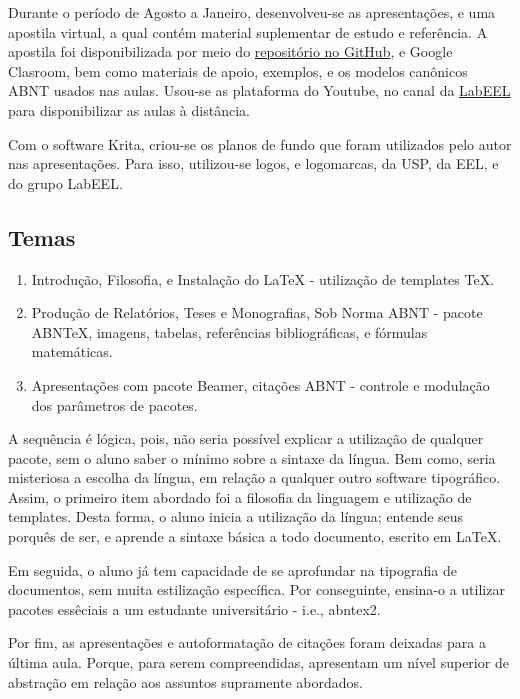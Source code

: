 \documentclass[
12pt,				%
openright,			%
oneside,			%
a4paper,			%
english,			%
french,				%
spanish,			%
brazil,				%
]{abntex2}
\begin{document}
Durante o período de Agosto a Janeiro, desenvolveu-se as apresentações, e
uma apostila virtual, a qual contém material suplementar de estudo e
referência. A apostila foi disponibilizada por meio do
\href{https://github.com/26-55-87-BuddhiLW/MC-LaTeX}{repositório no
  GitHub}, e Google Clasroom, bem como materiais de apoio,
exemplos, e os modelos canônicos ABNT usados nas aulas.  Usou-se as
plataforma do Youtube, no canal da
\href{https://www.youtube.com/channel/UC9kL6UL-iEq4nJKGs1nezQQ}{LabEEL}
para disponibilizar as aulas à distância.

Com o software Krita, criou-se os planos de fundo que foram utilizados
pelo autor nas apresentações. Para isso, utilizou-se logos, e
logomarcas, da USP, da EEL, e do grupo LabEEL.


\subsection{Temas}

\begin{enumerate}
\item Introdução, Filosofia, e Instalação do LaTeX - utilização de templates TeX.
\item Produção de Relatórios, Teses e Monografias, Sob Norma ABNT -
  pacote ABNTeX, imagens, tabelas, referências bibliográficas, e
  fórmulas matemáticas.
\item  Apresentações com pacote Beamer, citações ABNT - controle e modulação dos parâmetros de pacotes.
\end{enumerate}


A sequência é lógica, pois, não seria possível explicar a utilização de qualquer
pacote, sem o aluno saber o mínimo sobre a sintaxe da língua. Bem como, seria
misteriosa a escolha da língua, em relação a qualquer outro software tipográfico. Assim,
o primeiro item abordado foi a filosofia da linguagem e utilização de templates.
Desta forma, o aluno inicia a utilização da língua; entende seus porquês de ser,
e aprende a sintaxe básica a todo documento, escrito em \LaTeX.

Em seguida, o aluno já tem capacidade de se aprofundar na tipografia de documentos, sem muita
estilização específica. Por conseguinte, ensina-o a utilizar pacotes essêciais
a um estudante universitário - i.e., abntex2.

Por fim, as apresentações e autoformatação de citações foram
deixadas para a última aula. Porque, para serem compreendidas, apresentam um nível superior de abstração em relação aos assuntos supramente abordados.
\end{document}
